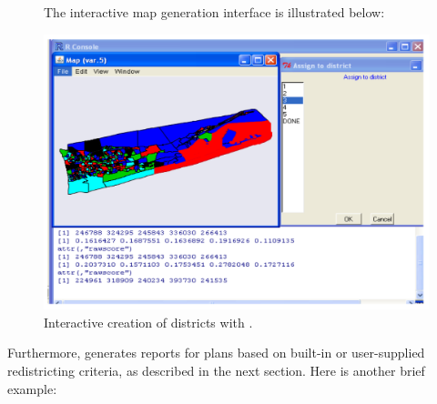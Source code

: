 \documentclass[article]{JSSstyle/jss}
\begin{document}
\begin{figure}[!h]
  The interactive map generation interface is illustrated below:
  \begin{center}
    \includegraphics[page=1]{edit_map.pdf}
  \end{center}

  \caption{\small Interactive creation of districts with .}
  \label{fig:edit}
\end{figure}
\newpage


Furthermore,  generates reports for plans based on built-in or user-supplied redistricting criteria, as described in the next section. Here is another brief example:
\end{document}
